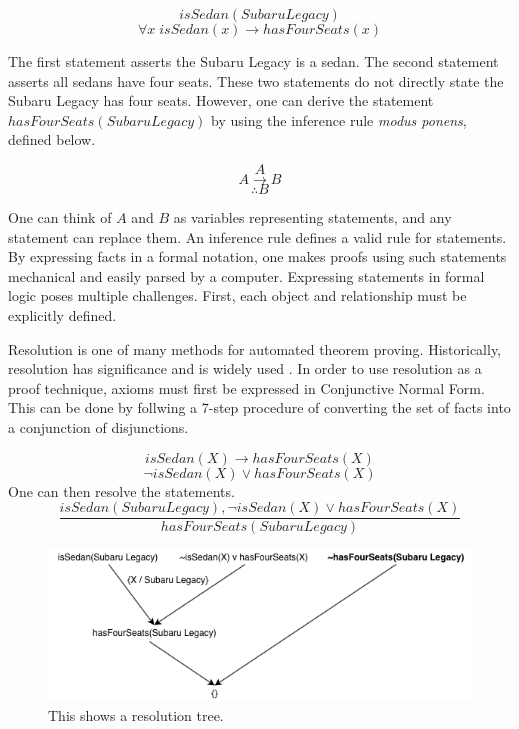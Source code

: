 \documentclass{article}
\begin{document}
\begin{singlespace}
\[isSedan(Subaru Legacy)\]
\[\forall x \; isSedan(x) \rightarrow hasFourSeats(x)\]
\end{singlespace} 

The first statement asserts the Subaru Legacy is a sedan. The second statement asserts all sedans have four seats. These two statements do not directly state the Subaru Legacy has four seats. However, one can derive the statement $hasFourSeats(Subaru Legacy)$ by using the inference rule \textit{modus ponens}, defined below. 
\begin{singlespace}
\[A\]
\[A \rightarrow B\]
 \[\therefore B\]
\end{singlespace} 

One can think of $A$ and $B$ as variables representing statements, and any statement can replace them. An inference rule defines a valid rule for statements. By expressing facts in a formal notation, one makes proofs using such statements mechanical and easily parsed by a computer. Expressing statements in formal logic poses multiple challenges. First, each object and relationship must be explicitly defined.

Resolution is one of many methods for automated theorem proving. Historically, resolution has significance and is widely used \cite[51]{ertel2018introduction}.
In order to use resolution as a proof technique, axioms must first be expressed in Conjunctive Normal Form. This can be done by follwing a 7-step procedure of converting the set of facts into a conjunction of disjunctions. 
\begin{singlespace}
 \[isSedan(X) \rightarrow hasFourSeats(X)\]
\[\lnot isSedan(X) \lor hasFourSeats(X)\]
One can then resolve the statements. 
\[\frac{isSedan(Subaru Legacy), \lnot isSedan(X) \lor hasFourSeats(X)}{hasFourSeats(Subaru Legacy)}\]
\end{singlespace} 

\begin{figure}[h]
\centering
\includegraphics[width=6in]{resolution_tree}
\caption{This shows a resolution tree.}
\label{fig:resolution_tree}
\end{figure}
\end{document}
